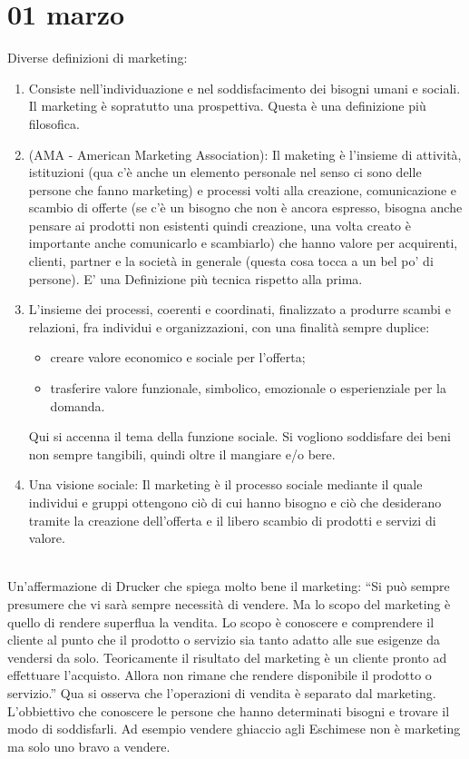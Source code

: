 \documentclass[11pt]{article}
\begin{document}
\section{01 marzo}
Diverse definizioni di marketing:
\begin{enumerate}[noitemsep,topsep=0ex]
	\item Consiste nell'individuazione e nel soddisfacimento dei bisogni umani e sociali. 
	Il marketing è sopratutto una prospettiva. 
	Questa è una definizione più filosofica.
	
	\item (AMA - American Marketing Association): Il maketing è l'insieme di attività, istituzioni (qua c'è anche un elemento personale nel senso ci sono delle persone che fanno marketing) e processi volti alla creazione, comunicazione e scambio di offerte (se c'è un bisogno che non è ancora espresso, bisogna anche pensare ai prodotti non esistenti quindi creazione, una volta creato è importante anche comunicarlo e scambiarlo) che hanno valore per acquirenti, clienti, partner e la società in generale (questa cosa tocca a un bel po' di persone). 
	E' una Definizione più tecnica rispetto alla prima.
	
	\item L'insieme dei processi, coerenti e coordinati, finalizzato a produrre scambi e relazioni, fra individui e organizzazioni, con una finalità sempre duplice: 
	\begin{itemize}[noitemsep]
		\item creare valore economico e sociale per l'offerta;
		\item trasferire valore funzionale, simbolico, emozionale o esperienziale per la domanda.
	\end{itemize} 
	Qui si accenna il tema della funzione sociale. 
	Si vogliono soddisfare dei beni non sempre tangibili, quindi oltre il mangiare e/o bere.
	
	\item Una visione sociale: Il marketing è il processo sociale mediante il quale individui e gruppi ottengono ciò di cui hanno bisogno e ciò che desiderano tramite la creazione dell'offerta e il libero scambio di prodotti e servizi di valore.
\end{enumerate}

~\\
Un'affermazione di Drucker che spiega molto bene il marketing: 
\enquote{Si può sempre presumere che vi sarà sempre necessità di vendere.
	Ma lo scopo del marketing è  quello di rendere superflua la vendita. 
	Lo scopo è conoscere e comprendere il cliente al punto che il prodotto o servizio sia tanto adatto alle sue esigenze da vendersi da solo.
	Teoricamente il risultato del marketing è un cliente pronto ad effettuare l'acquisto. 
	Allora non rimane che rendere disponibile il prodotto o servizio.}
\newline
Qua si osserva che l'operazioni di vendita è separato dal marketing. L'obbiettivo che conoscere le persone che hanno determinati bisogni e trovare il modo di soddisfarli. Ad esempio vendere ghiaccio agli Eschimese non è marketing ma solo uno bravo a vendere.
\end{document}
